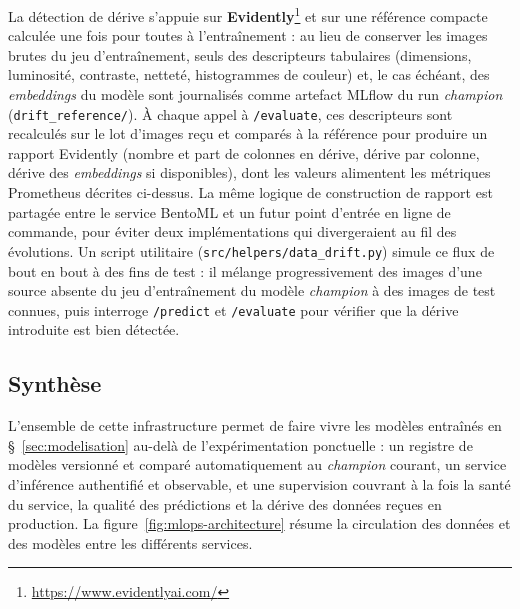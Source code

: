 La détection de dérive s'appuie sur \textbf{Evidently}\footnote{\url{https://www.evidentlyai.com/}} et sur une référence compacte calculée une fois pour toutes à l'entraînement : au lieu de conserver les images brutes du jeu d'entraînement, seuls des descripteurs tabulaires (dimensions, luminosité, contraste, netteté, histogrammes de couleur) et, le cas échéant, des \emph{embeddings} du modèle sont journalisés comme artefact MLflow du run \emph{champion} (\texttt{drift\_reference/}).
À chaque appel à \texttt{/evaluate}, ces descripteurs sont recalculés sur le lot d'images reçu et comparés à la référence pour produire un rapport Evidently (nombre et part de colonnes en dérive, dérive par colonne, dérive des \emph{embeddings} si disponibles), dont les valeurs alimentent les métriques Prometheus décrites ci-dessus.
La même logique de construction de rapport est partagée entre le service BentoML et un futur point d'entrée en ligne de commande, pour éviter deux implémentations qui divergeraient au fil des évolutions.
Un script utilitaire (\texttt{src/helpers/data\_drift.py}) simule ce flux de bout en bout à des fins de test : il mélange progressivement des images d'une source absente du jeu d'entraînement du modèle \emph{champion} à des images de test connues, puis interroge \texttt{/predict} et \texttt{/evaluate} pour vérifier que la dérive introduite est bien détectée.

\subsection{Synthèse}

L'ensemble de cette infrastructure permet de faire vivre les modèles entraînés en \S~\ref{sec:modelisation} au-delà de l'expérimentation ponctuelle : un registre de modèles versionné et comparé automatiquement au \emph{champion} courant, un service d'inférence authentifié et observable, et une supervision couvrant à la fois la santé du service, la qualité des prédictions et la dérive des données reçues en production.
La figure~\ref{fig:mlops-architecture} résume la circulation des données et des modèles entre les différents services.

